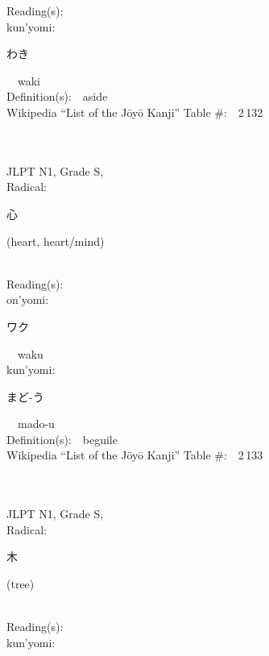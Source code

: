\begin{multicols}{2}
Reading(s):\ \ \\
{\hspace*{1em}}kun'yomi:\ \ \\
{\hspace*{2em}}{\begin{CJK}{UTF8}{min} わき \end{CJK}}\ \ waki\ \ \\
Definition(s):\ \ aside \\
Wikipedia ``List of the J\=oy\=o Kanji'' Table \#:\ \ 2\,132 \\
\ \ \\
{\fontsize{34pt}{40pt}  }\ \ \\
{JLPT N1, Grade S, \\Radical:\ \ {\begin{CJK}{UTF8}{min} 心 \end{CJK}} (heart, heart/mind) } \\
Reading(s):\ \ \\
{\hspace*{1em}}on'yomi:\ \ \\
{\hspace*{2em}}{\begin{CJK}{UTF8}{min} ワク \end{CJK}}\ \ waku\ \ \\
{\hspace*{1em}}kun'yomi:\ \ \\
{\hspace*{2em}}{\begin{CJK}{UTF8}{min} まど-う \end{CJK}}\ \ mado-u\ \ \\
Definition(s):\ \ beguile \\
Wikipedia ``List of the J\=oy\=o Kanji'' Table \#:\ \ 2\,133 \\
\ \ \\
{\fontsize{34pt}{40pt}  }\ \ \\
{JLPT N1, Grade S, \\Radical:\ \ {\begin{CJK}{UTF8}{min} 木 \end{CJK}} (tree) } \\
Reading(s):\ \ \\
{\hspace*{1em}}kun'yomi:\ \ \\

\end{multicols}
